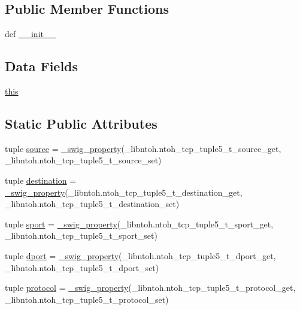\subsection*{Public Member Functions}
\begin{DoxyCompactItemize}
\item 
def \hyperlink{classlibntoh_1_1ntoh__tcp__tuple5__t_ac775ee34451fdfa742b318538164070e}{\-\_\-\-\_\-init\-\_\-\-\_\-}
\end{DoxyCompactItemize}
\subsection*{Data Fields}
\begin{DoxyCompactItemize}
\item 
\hyperlink{classlibntoh_1_1ntoh__tcp__tuple5__t_a05c09a5e9d53fa7adf0a7936038c2fa3}{this}
\end{DoxyCompactItemize}
\subsection*{Static Public Attributes}
\begin{DoxyCompactItemize}
\item 
tuple \hyperlink{classlibntoh_1_1ntoh__tcp__tuple5__t_aa873026052cc3e5ba03877243fcb7ecd}{source} = \hyperlink{namespacelibntoh_ae6f5626f776538e0cdb00e75ca1c96c9}{\-\_\-swig\-\_\-property}(\-\_\-libntoh.\-ntoh\-\_\-tcp\-\_\-tuple5\-\_\-t\-\_\-source\-\_\-get, \-\_\-libntoh.\-ntoh\-\_\-tcp\-\_\-tuple5\-\_\-t\-\_\-source\-\_\-set)
\item 
tuple \hyperlink{classlibntoh_1_1ntoh__tcp__tuple5__t_adaac82457baf1096d1c38cadf8123ce7}{destination} = \hyperlink{namespacelibntoh_ae6f5626f776538e0cdb00e75ca1c96c9}{\-\_\-swig\-\_\-property}(\-\_\-libntoh.\-ntoh\-\_\-tcp\-\_\-tuple5\-\_\-t\-\_\-destination\-\_\-get, \-\_\-libntoh.\-ntoh\-\_\-tcp\-\_\-tuple5\-\_\-t\-\_\-destination\-\_\-set)
\item 
tuple \hyperlink{classlibntoh_1_1ntoh__tcp__tuple5__t_a2833ef95f75538c4db32557cebba6eeb}{sport} = \hyperlink{namespacelibntoh_ae6f5626f776538e0cdb00e75ca1c96c9}{\-\_\-swig\-\_\-property}(\-\_\-libntoh.\-ntoh\-\_\-tcp\-\_\-tuple5\-\_\-t\-\_\-sport\-\_\-get, \-\_\-libntoh.\-ntoh\-\_\-tcp\-\_\-tuple5\-\_\-t\-\_\-sport\-\_\-set)
\item 
tuple \hyperlink{classlibntoh_1_1ntoh__tcp__tuple5__t_a5f69c896ed006fde20f09b7858fce13e}{dport} = \hyperlink{namespacelibntoh_ae6f5626f776538e0cdb00e75ca1c96c9}{\-\_\-swig\-\_\-property}(\-\_\-libntoh.\-ntoh\-\_\-tcp\-\_\-tuple5\-\_\-t\-\_\-dport\-\_\-get, \-\_\-libntoh.\-ntoh\-\_\-tcp\-\_\-tuple5\-\_\-t\-\_\-dport\-\_\-set)
\item 
tuple \hyperlink{classlibntoh_1_1ntoh__tcp__tuple5__t_ae535ff0dd346855882bd298a9e22bbc1}{protocol} = \hyperlink{namespacelibntoh_ae6f5626f776538e0cdb00e75ca1c96c9}{\-\_\-swig\-\_\-property}(\-\_\-libntoh.\-ntoh\-\_\-tcp\-\_\-tuple5\-\_\-t\-\_\-protocol\-\_\-get, \-\_\-libntoh.\-ntoh\-\_\-tcp\-\_\-tuple5\-\_\-t\-\_\-protocol\-\_\-set)
\end{DoxyCompactItemize}



